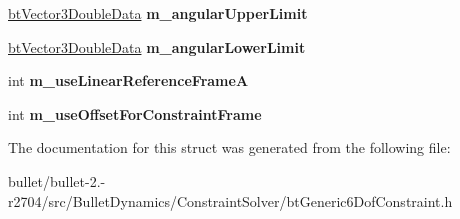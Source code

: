 \begin{DoxyCompactItemize}
\item 
\hypertarget{structbt_generic6_dof_constraint_double_data2_a94b1f3410314bf81b54acda688c7b7fa}{\hyperlink{structbt_vector3_double_data}{bt\+Vector3\+Double\+Data} {\bfseries m\+\_\+angular\+Upper\+Limit}}\label{structbt_generic6_dof_constraint_double_data2_a94b1f3410314bf81b54acda688c7b7fa}

\item 
\hypertarget{structbt_generic6_dof_constraint_double_data2_a185c18b1abf0d8eee7c7493f15f9b66d}{\hyperlink{structbt_vector3_double_data}{bt\+Vector3\+Double\+Data} {\bfseries m\+\_\+angular\+Lower\+Limit}}\label{structbt_generic6_dof_constraint_double_data2_a185c18b1abf0d8eee7c7493f15f9b66d}

\item 
\hypertarget{structbt_generic6_dof_constraint_double_data2_afbcfc0639b3608350b6deebeca3df638}{int {\bfseries m\+\_\+use\+Linear\+Reference\+Frame\+A}}\label{structbt_generic6_dof_constraint_double_data2_afbcfc0639b3608350b6deebeca3df638}

\item 
\hypertarget{structbt_generic6_dof_constraint_double_data2_a1fcc15b006fefb696bb8165f2caa083d}{int {\bfseries m\+\_\+use\+Offset\+For\+Constraint\+Frame}}\label{structbt_generic6_dof_constraint_double_data2_a1fcc15b006fefb696bb8165f2caa083d}

\end{DoxyCompactItemize}


The documentation for this struct was generated from the following file\+:\begin{DoxyCompactItemize}
\item 
bullet/bullet-\/2.-\/r2704/src/\+Bullet\+Dynamics/\+Constraint\+Solver/bt\+Generic6\+Dof\+Constraint.\+h\end{DoxyCompactItemize}

